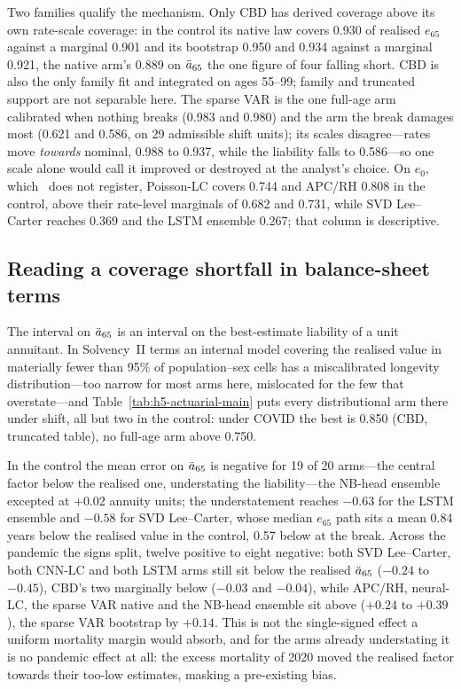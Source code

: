 Two families qualify the mechanism. Only CBD has
derived coverage above its own rate-scale coverage: in the control its native
law covers 0.930 of realised $e_{65}$ against a marginal 0.901 and its
bootstrap 0.950 and 0.934 against a marginal 0.921, the native arm's 0.889 on
$\ddot{a}_{65}$ the one figure of four falling short. CBD is also the only family
fit and integrated on ages 55--99; family and truncated support are not
separable here. The sparse VAR is the one full-age arm calibrated when nothing
breaks (0.983 and 0.980) and the arm the break damages most (0.621 and 0.586,
on 29 admissible shift units); its scales disagree---rates move \emph{towards}
nominal, 0.988 to 0.937, while the liability falls to 0.586---so one scale
alone would call it improved or destroyed at the analyst's choice. On
$e_0$, which \Hfive\ does not register, Poisson-LC covers 0.744 and APC/RH
0.808 in the control, above their rate-level marginals of 0.682 and 0.731,
while SVD Lee--Carter reaches 0.369 and the LSTM ensemble 0.267; that column is
descriptive.

\subsection{Reading a coverage shortfall in balance-sheet terms}

The interval on $\ddot{a}_{65}$ is an interval on the best-estimate liability of a
unit annuitant. In Solvency~II terms an internal model covering the realised
value in materially fewer than 95\% of population--sex cells has a
miscalibrated longevity distribution---too narrow for most arms here,
mislocated for the few that overstate---and Table~\ref{tab:h5-actuarial-main}
puts every distributional arm there under shift, all but two in the control:
under COVID the best is 0.850 (CBD, truncated table), no full-age arm above
0.750.

In the control the mean error on $\ddot{a}_{65}$ is negative for 19 of 20 arms---the
central factor below the realised one, understating the liability---the NB-head
ensemble excepted at $+0.02$ annuity units; the understatement reaches $-0.63$
for the LSTM ensemble and $-0.58$ for SVD Lee--Carter, whose median $e_{65}$
path sits a mean 0.84 years below the realised value in the control, 0.57 below
at the break. Across the pandemic the signs split, twelve positive to
eight negative: both SVD Lee--Carter, both CNN-LC and both LSTM arms still sit
below the realised $\ddot{a}_{65}$ ($-0.24$ to $-0.45$), CBD's two marginally below
($-0.03$ and $-0.04$), while APC/RH, neural-LC, the sparse VAR native and the
NB-head ensemble sit above ($+0.24$ to $+0.39$), the sparse VAR bootstrap by
$+0.14$. This is not the single-signed effect a uniform mortality
margin would absorb, and for the arms already understating it is no pandemic
effect at all: the excess mortality of 2020 moved the realised factor towards
their too-low estimates, masking a pre-existing bias.

